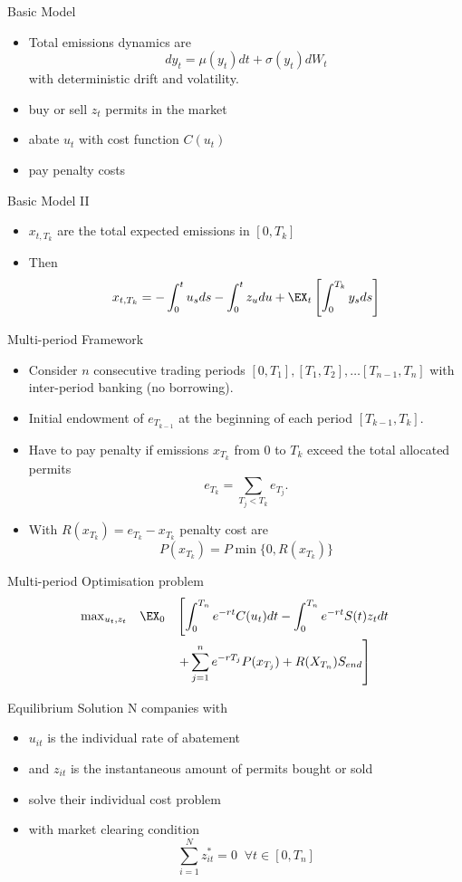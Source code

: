 {Basic Model}
\begin{itemize}
\item<1-> Total emissions dynamics are
\begin{equation}
dy_t= \mu(y_t)dt + \sigma(y_t)dW_t
\end{equation}
with deterministic drift and volatility.
\item<2-> buy or sell $z_t$  permits in the market
\item<3-> abate $u_t$ with cost function $C(u_t)$
\item<4-> pay penalty costs
\end{itemize}

{Basic Model II}
\begin{itemize}
\item<1-> $x_{t,T_k}$ are the total expected emissions in $[0,T_k]$
\item<2-> Then
\begin{equation}
x_{t,T_k}=-\int_0^tu_s ds  -\int_0^t z_u du + \EX_t\left[\int_0^{T_k} y_s ds \right]
\end{equation}
\end{itemize}

{Multi-period Framework}
\begin{itemize}
\item<1-> Consider $n$ consecutive trading periods $[0,T_1], [T_1, T_2], \ldots [T_{n-1}, T_n]$ with inter-period banking (no borrowing).
\item<2-> Initial endowment of $e_{T_{k-1}}$ at the beginning of each period $[T_{k-1}, T_k]$.
\item<3-> Have to pay penalty if emissions $x_{T_k}$ from $0$ to $T_k$ exceed the total allocated permits
$$
e_{T_k}= \sum_{T_j < T_k}e_{T_j}.
$$
\item<4-> With $R(x_{T_k})=e_{T_k}-x_{T_k}$ penalty cost are
$$
P(x_{T_k}) = P \min\{0, R(x_{T_k})\}
$$
\end{itemize}

{Multi-period Optimisation problem}
$$
\begin{array}{lll}
\max_{u_t, z_t} & \EX_0& \left[ \displaystyle\int_0^{T_n}e^{-rt}C(u_t)dt - \int_0^{T_n}e^{-rt}S(t) z_tdt \right. \\*[12pt]
& & \displaystyle \left. + \sum_{j=1}^n e^{-rT_j}P(x_{T_j}) + R(X_{T_n}) S_{end}\right]
\end{array}
$$

{Equilibrium Solution}
N companies with
\begin{itemize}
\item<1-> $u_{it}$ is the individual rate of abatement
\item<2-> and $z_{it}$ is the instantaneous amount of permits bought or sold
\item<3-> solve their individual cost problem
\item<4-> with market clearing condition
$$
\sum_{i=1}^N z_{it}^*=0 \;\;  \forall t \in [0, T_n]
$$
\end{itemize}

